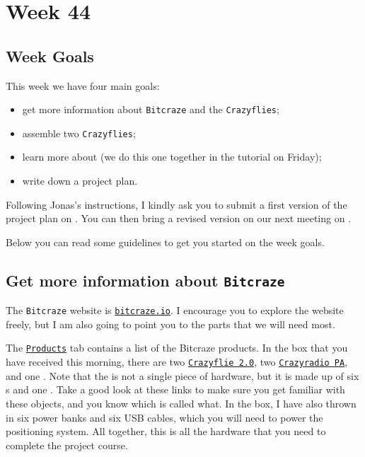 \chapter*{Week 44}


\section*{Week Goals}

This week we have four main goals:
\begin{itemize}
\item get more information about \texttt{Bitcraze} and the \texttt{Crazyflies};
\item assemble two \texttt{Crazyflies};
\item learn more about \ROS{} (we do this one together in the tutorial on Friday);
\item write down a project plan.
\end{itemize}

Following Jonas's instructions, I kindly ask you to submit a first version of the project plan on .
You can then bring a revised version on our next meeting on .

Below you can read some guidelines to get you started on the week goals.



\section*{Get more information about \texttt{Bitcraze}}

The \texttt{Bitcraze} website is \href{https://bitcraze.io}{\texttt{bitcraze.io}}.
I encourage you to explore the website freely, but I am also going to point you to the parts that we will need most.

The \href{}{\texttt{Products}} tab contains a list of the Bitcraze products.
In the box that you have received this morning, there are two \href{https://www.bitcraze.io/crazyflie-2/}{\texttt{Crazyflie 2.0}}, two \href{https://www.bitcraze.io/crazyradio-pa/}{\texttt{Crazyradio PA}}, and one \href{https://www.bitcraze.io/loco-pos-system/}{\LPS{}}.
Note that the \href{}{\LPS{}} is not a single piece of hardware, but it is made up of six \href{https://www.bitcraze.io/loco-pos-deck/}{\LPN{}}s and one \href{https://www.bitcraze.io/loco-pos-deck/}{\LPD{}}.
Take a good look at these links to make sure you get familiar with these objects, and you know which is called what.
In the box, I have also thrown in six power banks and six USB cables, which you will need to power the positioning system.
All together, this is all the hardware that you need to complete the project course.

